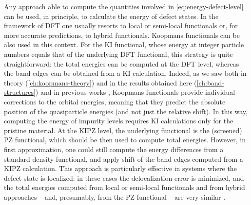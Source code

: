 Any approach able to compute the quantities involved in \cref{eq:energy-defect-level} can be used, in principle, to calculate the energy of defect states. In the framework of DFT one usually resorts to local or semi-local functionals or, for more accurate predictions, to hybrid functionals. Koopmans functionals can be also used in this context. For the KI functional, whose energy at integer particle numbers equals that of the underlying DFT functional, this strategy is quite straightforward: the total energies can be computed at the DFT level, whereas the band edges can be obtained from a KI calculation. Indeed, as we saw both in theory (\cref{ch:koopmans-theory}) and in the results obtained here (\cref{ch:band-structures}) and in previous works \cite{nguyen_koopmans-compliant_2018,colonna_koopmans-compliant_2019}, Koopmans functionals provide individual corrections to the orbital energies, meaning that they predict the absolute position of the quasiparticle energies (and not just the relative shift). In this way, computing the energy of impurity levels requires KI calculations only for the pristine material. At the KIPZ level, the underlying functional is the (screened) PZ functional, which should be then used to compute total energies. However, in first approximation, one could still compute the energy differences from a standard density-functional, and apply shift of the band edges computed from a KIPZ calculation. This approach is particularly effective in systems where the defect state is localized: in these cases the delocalization error is minimized, and the total energies computed from local or semi-local functionals and from hybrid approaches -- and, presumably, from the PZ functional -- are very similar \cite{komsa_assessing_2011}.

